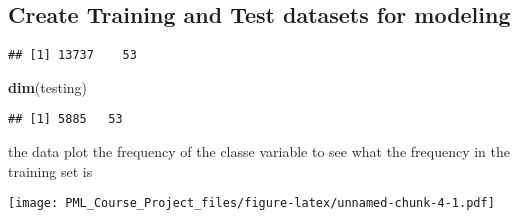 \documentclass[
]{article}
\newenvironment{Shaded}{\begin{snugshade}}{\end{snugshade}}
\newcommand{\DataTypeTok}[1]{\textcolor[rgb]{0.13,0.29,0.53}{#1}}
\newcommand{\DecValTok}[1]{\textcolor[rgb]{0.00,0.00,0.81}{#1}}
\newcommand{\FloatTok}[1]{\textcolor[rgb]{0.00,0.00,0.81}{#1}}
\newcommand{\KeywordTok}[1]{\textcolor[rgb]{0.13,0.29,0.53}{\textbf{#1}}}
\newcommand{\NormalTok}[1]{#1}
\newcommand{\OperatorTok}[1]{\textcolor[rgb]{0.81,0.36,0.00}{\textbf{#1}}}
\newcommand{\OtherTok}[1]{\textcolor[rgb]{0.56,0.35,0.01}{#1}}
\newcommand{\StringTok}[1]{\textcolor[rgb]{0.31,0.60,0.02}{#1}}
\begin{document}
\hypertarget{create-training-and-test-datasets-for-modeling}{%
\subsection{Create Training and Test datasets for
modeling}\label{create-training-and-test-datasets-for-modeling}}

\begin{Shaded}
\end{Shaded}

\begin{verbatim}
## [1] 13737    53
\end{verbatim}

\begin{Shaded}
\begin{Highlighting}[]
\KeywordTok{dim}\NormalTok{(testing)}
\end{Highlighting}
\end{Shaded}

\begin{verbatim}
## [1] 5885   53
\end{verbatim}

the data plot the frequency of the classe variable to see what the
frequency in the training set is

\begin{Shaded}
\end{Shaded}

\texttt{[image: PML\_Course\_Project\_files/figure-latex/unnamed-chunk-4-1.pdf]}
\end{document}
